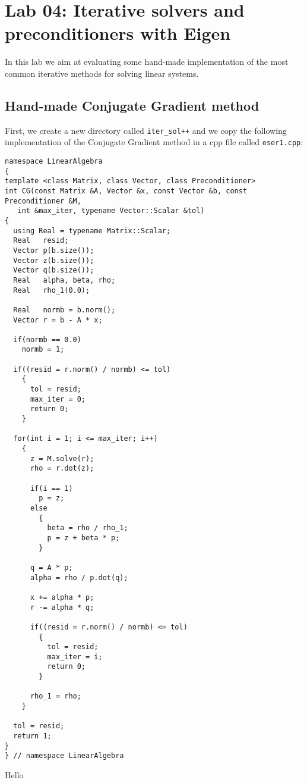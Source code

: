 
\chapter{Lab 04: Iterative solvers and preconditioners with Eigen}
\thispagestyle{empty}

In this lab we aim at evaluating some hand-made implementation of the most common iterative methods for solving linear systems.

\section{Hand-made Conjugate Gradient method}

First, we create a new directory called \texttt{iter\_sol++} and we copy the following implementation of the Conjugate Gradient method in a cpp file called \texttt{eser1.cpp}:

\begin{lstlisting}
namespace LinearAlgebra
{
template <class Matrix, class Vector, class Preconditioner>
int CG(const Matrix &A, Vector &x, const Vector &b, const Preconditioner &M,
   int &max_iter, typename Vector::Scalar &tol)
{
  using Real = typename Matrix::Scalar;
  Real   resid;
  Vector p(b.size());
  Vector z(b.size());
  Vector q(b.size());
  Real   alpha, beta, rho;
  Real   rho_1(0.0);

  Real   normb = b.norm();
  Vector r = b - A * x;

  if(normb == 0.0)
    normb = 1;

  if((resid = r.norm() / normb) <= tol)
    {
      tol = resid;
      max_iter = 0;
      return 0;
    }

  for(int i = 1; i <= max_iter; i++)
    {
      z = M.solve(r);
      rho = r.dot(z);

      if(i == 1)
        p = z;
      else
        {
          beta = rho / rho_1;
          p = z + beta * p;
        }

      q = A * p;
      alpha = rho / p.dot(q);

      x += alpha * p;
      r -= alpha * q;

      if((resid = r.norm() / normb) <= tol)
        {
          tol = resid;
          max_iter = i;
          return 0;
        }

      rho_1 = rho;
    }

  tol = resid;
  return 1;
}
} // namespace LinearAlgebra   
\end{lstlisting}

Hello


